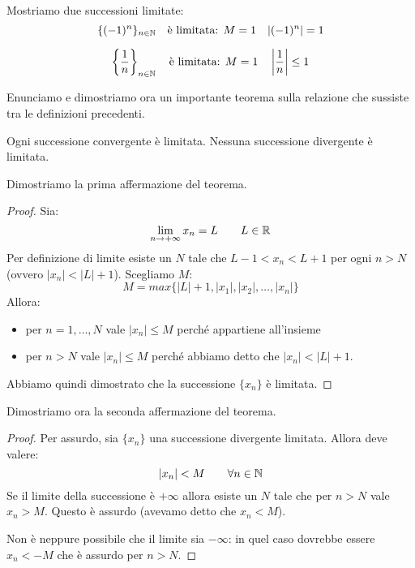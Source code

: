 \begin{example}
Mostriamo due successioni limitate:
\begin{equation*}
\{(-1)^n\}_{n \in \mathbb N} \quad \text{è limitata: } M = 1 \quad |(-1)^n| = 1
\end{equation*}

\begin{equation*}
\left\{ \frac{1}{n} \right\}_{n \in \mathbb N} \quad \text{è limitata: } M = 1 \quad \left|\frac{1}{n}\right| \le 1
\end{equation*}
\end{example}

Enunciamo e dimostriamo ora un importante teorema sulla relazione che sussiste tra le definizioni precedenti.
\begin{theorem}
Ogni successione convergente è limitata. Nessuna successione divergente è limitata.
\end{theorem}
Dimostriamo la prima affermazione del teorema.
\begin{proof}
Sia:
\begin{equation*}
\lim_{n \to +\infty} x_n = L \qquad L \in \mathbb R
\end{equation*}
Per definizione di limite esiste un $N$ tale che $L - 1 < x_n < L + 1$ per ogni $n > N$ (ovvero $|x_n| < |L| + 1$).
Scegliamo $M$:
\begin{equation*}
M = max\{|L|+1, |x_1|, |x_2|, \ldots, |x_n|\}
\end{equation*}
Allora:
\begin{itemize}
\item per $n = 1, \ldots, N$ vale $|x_n| \le M$ perché appartiene all'insieme
\item per $n > N$ vale $|x_n| \le M$ perché abbiamo detto che $|x_n| < |L| + 1$.
\end{itemize}
Abbiamo quindi dimostrato che la successione $\{x_n\}$ è limitata.
\end{proof}
Dimostriamo ora la seconda affermazione del teorema.
\begin{proof}
Per assurdo, sia $\{x_n\}$ una successione divergente limitata. Allora deve valere:
\begin{equation*}
|x_n| < M \qquad \forall n \in \mathbb N
\end{equation*}
Se il limite della successione è $+\infty$ allora esiste un $N$ tale che per $n > N$ vale $x_n > M$. Questo è assurdo (avevamo detto che $x_n < M$).

Non è neppure possibile che il limite sia $-\infty$: in quel caso dovrebbe essere $x_n < -M$ che è assurdo per $n > N$.
\end{proof}

